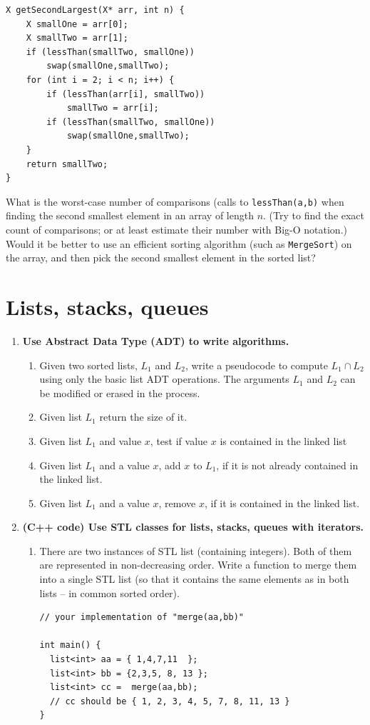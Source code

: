 \documentclass[a4paper,12pt]{article}
\begin{document}
\begin{enumerate}[label=3.\Alph*.]
\begin{enumerate}
\begin{verbatim}
X getSecondLargest(X* arr, int n) {
    X smallOne = arr[0];
    X smallTwo = arr[1];
    if (lessThan(smallTwo, smallOne))
        swap(smallOne,smallTwo);
    for (int i = 2; i < n; i++) {
        if (lessThan(arr[i], smallTwo)) 
            smallTwo = arr[i];
        if (lessThan(smallTwo, smallOne))
            swap(smallOne,smallTwo);
    }
    return smallTwo;
}
\end{verbatim}

What is the worst-case number of comparisons (calls to {\tt lessThan(a,b)} 
when finding the second smallest element in an array of length $n$. 
(Try to find the exact count of comparisons; or at least estimate their number with Big-O notation.)
Would it be better to use an efficient sorting algorithm (such as {\tt MergeSort})
on the array, and then pick the second smallest element in the sorted list?
\end{enumerate}
\end{enumerate}


\section{Lists, stacks, queues}

\begin{enumerate}[label=4.\Alph*.]
\item {\bf Use Abstract Data Type (ADT) to write algorithms.}
\begin{enumerate}
\item Given two sorted lists, $L_1$ and $L_2$, write a pseudocode to compute $L_1 \cap L_2$ using only 
the basic list ADT operations. The arguments $L_1$ and $L_2$ can be modified or erased in the process. 
\item 
Given list $L_1$ return the size of it. 
\item 
Given list $L_1$ and value $x$, test if value $x$ is contained in the linked list
\item 
Given list $L_1$ and a value $x$, add $x$ to $L_1$, if it is not already contained in the linked list.
\item 
Given list $L_1$ and a value $x$, remove $x$, if it is contained in the linked list.
\end{enumerate}
\item {\bf (C++ code) Use STL classes for lists, stacks, queues with iterators.}
\begin{enumerate}
\item There are two instances of STL list (containing integers). 
Both of them are represented in non-decreasing order. 
Write a function to merge them into a single STL list (so that it contains the same
elements as in both lists -- in common sorted order). 

\begin{verbatim}
// your implementation of "merge(aa,bb)" 

int main() {
  list<int> aa = { 1,4,7,11  }; 
  list<int> bb = {2,3,5, 8, 13 }; 
  list<int> cc =  merge(aa,bb); 
  // cc should be { 1, 2, 3, 4, 5, 7, 8, 11, 13 }
}
\end{verbatim}
\end{enumerate}
\end{enumerate}
\end{document}
